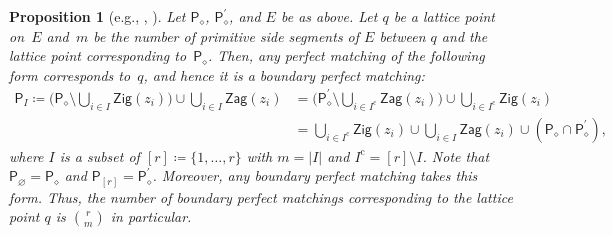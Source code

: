 \documentclass[pdftex]{sigma}
\numberwithin{equation}{section}
\newtheorem{Proposition}[Theorem]{Proposition}
\theoremstyle{definition}
\newcommand{\rmc}{\mathrm{c}}
\newcommand{\sfP}{\mathsf{P}}
\newcommand{\Zig}{\mathsf{Zig}}
\newcommand{\Zag}{\mathsf{Zag}}
\newcommand{\cPM}{\sfP_\diamond}
\begin{document}
\begin{Proposition}[{e.g., \cite[Proposition~4.35]{Bro_dimer}, \cite[Corollary~3.8]{Gul}}]
\label{char_bound}
Let $\cPM$, $\cPM^\prime$, and $E$ be as above.
Let $q$ be a lattice point on~$E$ and~$m$ be the number of primitive side segments of $E$ between $q$ and the lattice point corresponding to~$\cPM$.
Then, any perfect matching of the following form corresponds to~$q$, and hence it is a boundary perfect matching:
\begin{align*}
\sfP_I\coloneqq\biggl(\cPM{\setminus}\bigcup_{i\in I}\Zig(z_i)\biggr)\cup\bigcup_{i\in I}\Zag(z_i)
&=\biggl(\cPM^\prime{\setminus}\bigcup_{i\in I^\rmc}\Zag(z_i)\biggr)\cup\bigcup_{i\in I^\rmc}\Zig(z_i)\\
&=\bigcup_{i\in I^\rmc}\Zig(z_i)\cup\bigcup_{i\in I}\Zag(z_i)\cup (\cPM\cap\cPM^\prime ),
\end{align*}
where $I$ is a subset of $[r]\coloneqq\{1, \dots, r\}$ with $m=|I|$ and $I^\rmc=[r]{\setminus}I$.
Note that $\sfP_\varnothing=\cPM$ and $\sfP_{[r]}=\cPM^\prime$.
Moreover, any boundary perfect matching takes this form.
Thus, the number of boundary perfect matchings corresponding to the lattice point $q$ is $\binom{r}{m}$ in particular.
\end{Proposition}
\end{document}
